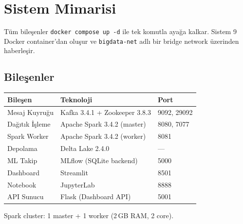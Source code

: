 \documentclass[12pt,a4paper]{article}
\begin{document}
\section{Sistem Mimarisi}

Tüm bileşenler \texttt{docker compose up -d} ile tek komutla ayağa kalkar. Sistem 9 Docker container'dan oluşur ve \texttt{bigdata-net} adlı bir bridge network üzerinden haberleşir.

\subsection{Bileşenler}
\begin{table}[H]\centering
\begin{tabular}{lll}
\toprule
\textbf{Bileşen} & \textbf{Teknoloji} & \textbf{Port} \\
\midrule
Mesaj Kuyruğu   & Kafka 3.4.1 + Zookeeper 3.8.3 & 9092, 29092 \\
Dağıtık İşleme  & Apache Spark 3.4.2 (master)   & 8080, 7077 \\
Spark Worker    & Apache Spark 3.4.2 (worker)   & 8081 \\
Depolama         & Delta Lake 2.4.0              & --- \\
ML Takip         & MLflow (SQLite backend)       & 5000 \\
Dashboard        & Streamlit                     & 8501 \\
Notebook         & JupyterLab                    & 8888 \\
API Sunucu       & Flask (Dashboard API)         & 5001 \\
\bottomrule
\end{tabular}
\end{table}

Spark cluster: 1 master + 1 worker (2\,GB RAM, 2 core).
\end{document}
